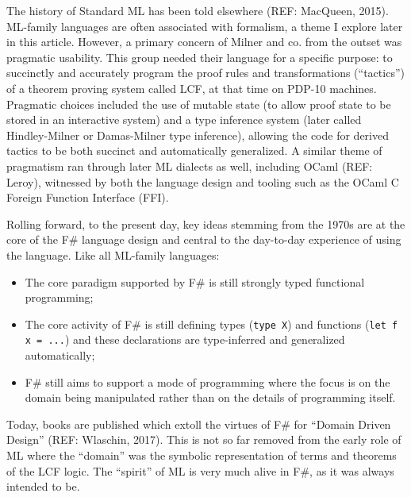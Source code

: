 \documentclass[acmsmall,review]{acmart}\settopmatter{printfolios=true,printccs=false,printacmref=false}
\begin{document}
The history of Standard ML has been told elsewhere (REF: MacQueen, 2015). ML-family languages are often associated with formalism, a theme I explore later in this article. However, a primary concern of Milner and co. from the outset was pragmatic usability. This group needed their language for a specific purpose: to succinctly and accurately program the proof rules and transformations (“tactics”) of a theorem proving system called LCF, at that time on PDP-10 machines. Pragmatic choices included the use of mutable state (to allow proof state to be stored in an interactive system) and a type inference system (later called Hindley-Milner or Damas-Milner type inference), allowing the code for derived tactics to be both succinct and automatically generalized.  A similar theme of pragmatism ran through later ML dialects as well, including OCaml (REF: Leroy), witnessed by both the language design and tooling such as the OCaml C Foreign Function Interface (FFI).

Rolling forward, to the present day, key ideas stemming from the 1970s are at the core of the F\# language design and central to the day-to-day experience of using the language.  Like all ML-family languages:
\begin{itemize}
\item The core paradigm supported by F\# is still strongly typed functional programming;
\item The core activity of F\# is still defining types (\texttt{type X}) and functions (\texttt{let f x = ...}) and these declarations are type-inferred and generalized automatically;
\item F\# still aims to support a mode of programming where the focus is on the domain being manipulated rather than on the details of programming itself.
\end{itemize}

Today, books are published which extoll the virtues of F\# for “Domain Driven Design” (REF: Wlaschin, 2017).  This is not so far removed from the early role of ML where the “domain” was the symbolic representation of terms and theorems of the LCF logic. The “spirit” of ML is very much alive in F\#, as it was always intended to be. 
\end{document}

